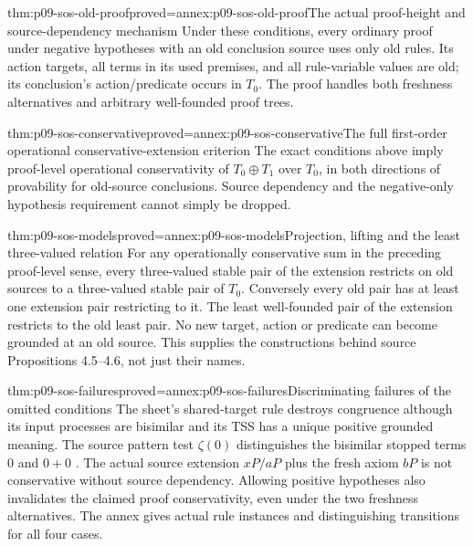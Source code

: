 \begin{hblemma}{thm:p09-sos-old-proof}{proved=annex:p09-sos-old-proof}{The actual proof-height and source-dependency mechanism}
Under these conditions, every ordinary proof under negative hypotheses
with an old conclusion source uses only old rules. Its action targets,
all terms in its used premises, and all rule-variable values are old;
its conclusion's action/predicate occurs in \(T_0\). The proof handles
both freshness alternatives and arbitrary well-founded proof trees.
\end{hblemma}

\begin{hbtheorem}{thm:p09-sos-conservative}{proved=annex:p09-sos-conservative}{The full first-order operational conservative-extension criterion}
The exact conditions above imply proof-level operational conservativity
of \(T_0\oplus T_1\) over \(T_0\), in both directions of
provability for old-source conclusions. Source dependency and the
negative-only hypothesis requirement cannot simply be dropped.
\end{hbtheorem}

\begin{hbtheorem}{thm:p09-sos-models}{proved=annex:p09-sos-models}{Projection, lifting and the least three-valued relation}
For any operationally conservative sum in the preceding proof-level
sense, every three-valued stable pair of the extension restricts on old
sources to a three-valued stable pair of \(T_0\). Conversely every
old pair has at least one extension pair restricting to it. The
least well-founded pair of the extension restricts to the old least
pair. No new target, action or predicate can become grounded at an
old source. This supplies the constructions behind source
Propositions 4.5--4.6, not just their names.
\end{hbtheorem}


\begin{hbtheorem}{thm:p09-sos-failures}{proved=annex:p09-sos-failures}{Discriminating failures of the omitted conditions}
The sheet's shared-target rule destroys congruence although its
input processes are bisimilar and its TSS has a unique positive
grounded meaning. The source pattern test \(\zeta(0)\) distinguishes
the bisimilar stopped terms \(0\) and \(0+0\)
\parencite[\S6]{BloomIstrailMeyer2003GSOSAuthor}.
The actual source extension \(xP/aP\) plus the fresh axiom \(bP\)
is not conservative without source dependency. Allowing positive
hypotheses also invalidates the claimed proof conservativity, even
under the two freshness alternatives. The annex gives actual rule
instances and distinguishing transitions for all four cases.
\end{hbtheorem}

